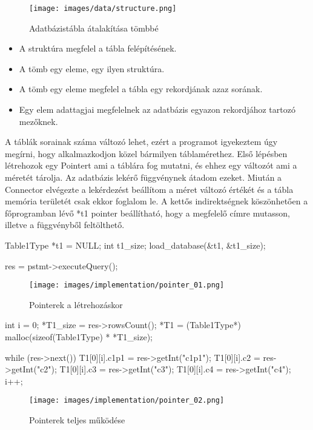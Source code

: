 \begin{figure}[h!]
\centering
\texttt{[image: images/data/structure.png]}
\caption{Adatbázistábla átalakítása tömbbé}
\label{fig:opencl}
\end{figure}

\begin{itemize}
\item A struktúra megfelel a tábla felépítésének.
\item A tömb egy eleme, egy ilyen struktúra.
\item A tömb egy eleme megfelel a tábla egy rekordjának azaz sorának.
\item Egy elem adattagjai megfelelnek az adatbázis egyazon rekordjához tartozó mezőknek.
\end{itemize}

\newpage
{}

A táblák sorainak száma változó lehet, ezért a programot igyekeztem úgy megírni, hogy alkalmazkodjon közel bármilyen táblamérethez.
Első lépésben létrehozok egy Pointert ami a táblára fog mutatni, és ehhez egy változót ami a méretét tárolja. Az adatbázis lekérő függvénynek átadom ezeket.
Miután a Connector elvégezte a lekérdezést beállítom a méret változó értékét és a tábla memória területét csak ekkor foglalom le. A kettős indirektségnek köszönhetően a főprogramban lévő *t1 pointer beállítható, hogy a megfelelő címre mutasson, illetve a függvényből feltölthető.
\begin{cpp}
Table1Type *t1 = NULL;
int t1_size;
load_database(&t1, &t1_size);
	
res = pstmt->executeQuery();
\end{cpp}
\begin{figure}[h!]
\centering
\texttt{[image: images/implementation/pointer\_01.png]}
\caption{Pointerek a létrehozáskor}
\label{fig:opencl}
\end{figure}

\begin{cpp}
int i = 0;
*T1_size = res->rowsCount();
*T1 = (Table1Type*) malloc(sizeof(Table1Type) * *T1_size);

while (res->next())
{
	T1[0][i].c1p1 = res->getInt("c1p1");
	T1[0][i].c2 = res->getInt("c2");
	T1[0][i].c3 = res->getInt("c3");
	T1[0][i].c4 = res->getInt("c4");
	i++;
}
\end{cpp}

\begin{figure}[h!]
\centering
\texttt{[image: images/implementation/pointer\_02.png]}
\caption{Pointerek teljes működése}
\label{fig:opencl}
\end{figure}

